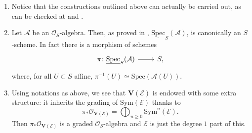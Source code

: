 \begin{rem}[]\leavevmode\vspace{-.2\baselineskip}
\begin{enumerate}
	\item Notice that the constructions outlined above can actually be carried out,
		as can be checked at 
		\cite[\href{https://stacks.math.columbia.edu/tag/01LL}{Section 01LL}]{SP}
		and
		\cite[\href{https://stacks.math.columbia.edu/tag/01M1}{Section 01M1}]{SP}.

	\item Let $\mathcal{A}$ be an $\mathcal{O}_{ S }$-algebra. 
		Then, as proved in 
		\cite[\href{https://stacks.math.columbia.edu/tag/01LP}{Lemma 01LP}]{SP},
		$\underline{\mathrm{Spec}}_S(\mathcal{A})$, is canonically an $S$-scheme.
		In fact there is a morphism of schemes
		\begin{equation*}
		\begin{tikzcd}[row sep = 0ex
			,/tikz/column 1/.append style={anchor=base east}
			,/tikz/column 2/.append style={anchor=base west}]
			\pi\colon \underline{\mathrm{Spec}}_S(\mathcal{A})
			\arrow[r, "", rightarrow] &
			S
		,\end{tikzcd}
		\end{equation*} 
		where, for all $U \subset S$ affine, $\pi^{-1}(U) \simeq \mathrm{Spec}(\mathcal{A}(U))$.

	\item Using notations as above, we see that $\mathbf{V}(\mathcal{E})$ is endowed with
		some extra structure: it inherits the grading of $\mathrm{Sym}(\mathcal{E})$
		thanks to
		\begin{equation*}
			\pi_* \mathcal{O}_{ \mathbf{V}(\mathcal{E}) } =
			\bigoplus_{n \geq 0} \mathrm{Sym}^n (\mathcal{E})
		.\end{equation*}
		Then $\pi_* \mathcal{O}_{ \mathbf{V}(\mathcal{E}) }$ is a graded
		$\mathcal{O}_{ S }$-algebra and $\mathcal{E}$ is just the degree $1$ part
		of this.
\end{enumerate}
\end{rem}


